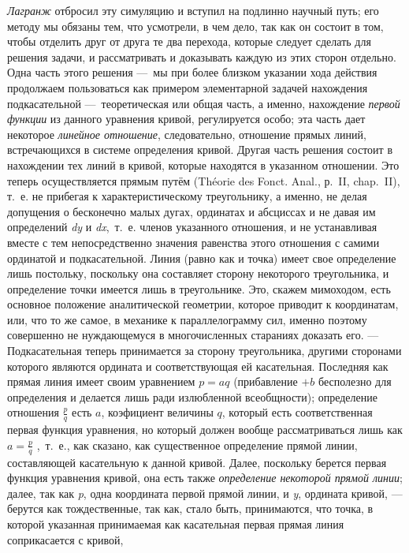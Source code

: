 {{\em Лагранж} отбросил эту симуляцию и вступил на
подлинно научный путь; его методу мы обязаны тем, что усмотрели, в чем
дело, так как он состоит в том, чтобы отделить друг от друга те два
перехода, которые следует сделать для решения задачи, и рассматривать и
доказывать каждую из этих сторон отдельно. Одна часть этого решения —~мы
при более близком указании хода действия продолжаем пользоваться как
примером элементарной задачей нахождения подкасательной —~теоретическая или
общая часть, а именно, нахождение {\em первой функции}
из данного уравнения кривой, регулируется особо; эта часть дает некоторое
{\em линейное отношение}, следовательно, отношение
прямых линий, встречающихся в системе определения кривой. Другая часть
решения состоит в нахождении тех линий в кривой, которые находятся в
указанном отношении. Это теперь осуществляется прямым путём
(Théorie des Fonct. Anal., р.~II, chap.~II), т.~е. не
прибегая к характеристическому треугольнику, а именно, не делая допущения о
бесконечно малых дугах, ординатах и абсциссах и не давая им определений
{\em dy} и {\em dx},~т.~е. членов
указанного отношения, и не устанавливая вместе с тем непосредственно
значения равенства этого отношения с самими ординатой и подкасательной.
Линия (равно как и точка) имеет свое определение лишь постольку, поскольку
она составляет сторону некоторого треугольника, и определение точки имеется
лишь в треугольнике. Это, скажем мимоходом, есть основное положение
аналитической геометрии, которое приводит к координатам, или, что то же
самое, в механике к параллелограмму сил, именно поэтому совершенно не
нуждающемуся в многочисленных стараниях доказать его. — Подкасательная
теперь принимается за сторону треугольника, другими сторонами которого
являются ордината и соответствующая ей касательная. Последняя как прямая
линия имеет своим уравнением  $p=\mathit{aq}$  (прибавление
$+b$ бесполезно для определения и делается лишь
ради излюбленной всеобщности); определение отношения  $\frac p q$  есть
$a$, коэфициент величины
$q$, который есть соответственная первая функция
уравнения, но который должен вообще рассматриваться лишь как  $a=\frac p q$
,~т.~е., как сказано, как существенное определение прямой линии,
составляющей касательную к данной кривой. Далее, поскольку берется первая
функция уравнения кривой, она есть также
{\em определение некоторой прямой линии}; далее, так
как {\em p}, одна координата первой прямой линии, и
{\em y}, ордината кривой, — берутся как тождественные,
так как, стало быть, принимаются, что точка, в которой указанная
принимаемая как касательная первая прямая линия соприкасается с кривой,
}
